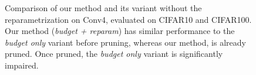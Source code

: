 
\begin{figure}
\centering
  \caption{Comparison of our method and its variant without the
  reparametrization on Conv4, evaluated on CIFAR10 and CIFAR100. Our method
  (\emph{budget + reparam}) has similar performance to the \emph{budget only}
  variant before pruning, whereas our method, is already pruned. Once pruned,
  the \emph{budget only} variant is significantly impaired.}
  \label{fig:chap1:budget_only_conv4}
\end{figure}

